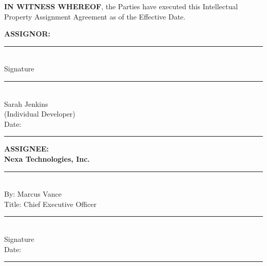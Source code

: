 \vspace{1.5em}
\noindent\textbf{IN WITNESS WHEREOF}, the Parties have executed this Intellectual Property Assignment Agreement as of the Effective Date.

\vspace{2.0em}

\noindent
\begin{minipage}[t]{0.45\textwidth}
  \fontsize{9.5}{12}\selectfont
  \color{legalnavy}\sffamily\bfseries ASSIGNOR:\\[1.2em]
  \normalfont\normalsize\color{black}
  \rule{0.9\textwidth}{0.5pt}\\[2pt]
  Signature\\[1.2em]
  \rule{0.9\textwidth}{0.5pt}\\[2pt]
  Sarah Jenkins\\
  (Individual Developer)\\[1.2em]
  Date: \rule{0.4\textwidth}{0.5pt}
\end{minipage}
\hfill
\begin{minipage}[t]{0.45\textwidth}
  \fontsize{9.5}{12}\selectfont
  \color{legalnavy}\sffamily\bfseries ASSIGNEE:\\
  \textbf{Nexa Technologies, Inc.}\\[1.2em]
  \normalfont\normalsize\color{black}
  \rule{0.9\textwidth}{0.5pt}\\[2pt]
  By: Marcus Vance\\
  Title: Chief Executive Officer\\[1.2em]
  \rule{0.9\textwidth}{0.5pt}\\[2pt]
  Signature\\[1.2em]
  Date: \rule{0.4\textwidth}{0.5pt}
\end{minipage}

\newpage
